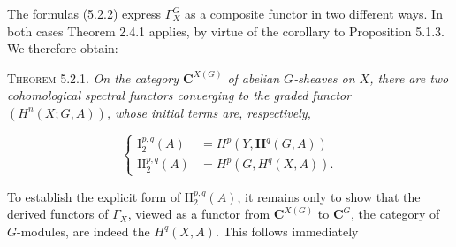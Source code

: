 The formulas (5.2.2) express $\Gamma_X^G$ as a composite functor in two
different ways. In both cases Theorem 2.4.1 applies, by virtue of the
corollary to Proposition 5.1.3. We therefore obtain:

\textsc{Theorem 5.2.1.} \textit{On the category ${\mathbf C}^{X(G)}$ of
abelian $G$-sheaves on $X$, there are two cohomological spectral functors
converging to the graded functor $(H^n(X;G,A))$, whose initial terms are,
respectively,}

\[
\tag{5.2.5}
\left\{
\begin{aligned}
\mathrm I_2^{p,q}(A)&=H^p(Y,\mathbf H^q(G,A))\\
\mathrm {II}_2^{p,q}(A)&=H^p(G,H^q(X,A)).
\end{aligned}
\right.
\]

To establish the explicit form of $\mathrm {II}_2^{p,q}(A)$, it remains only
to show that the derived functors of $\Gamma_X$, viewed as a functor from
${\mathbf C}^{X(G)}$ to ${\mathbf C}^G$, the category of $G$-modules, are indeed the
$H^q(X,A)$. This follows immediately

